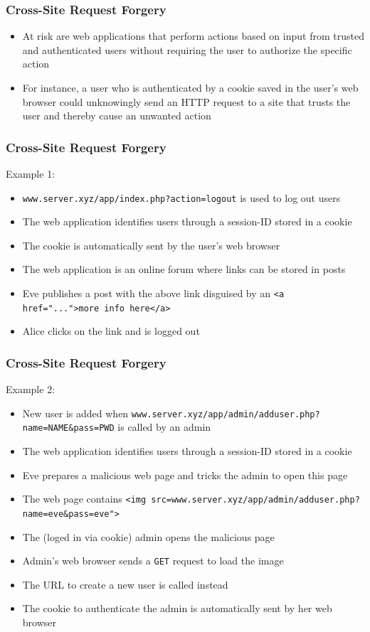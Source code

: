 \begin{frame}
    \frametitle{Cross-Site Request Forgery}
    \begin{itemize}
        \item At risk are web applications that perform actions based on input from trusted and authenticated users without requiring the user to authorize the specific action
        \item For instance, a user who is authenticated by a cookie saved in the user's web browser could unknowingly send an HTTP request to a site that trusts the user and thereby cause an unwanted action
    \end{itemize}
\end{frame}

\begin{frame}[fragile]
    \frametitle{Cross-Site Request Forgery}
    Example 1:
    \begin{itemize}
        \item \verb|www.server.xyz/app/index.php?action=logout| is used to log out users
        \item The web application identifies users through a session-ID stored in a cookie
        \item The cookie is automatically sent by the user's web browser
        \item The web application is an online forum where links can be stored in posts
        \item Eve publishes a post with the above link disguised by an \verb|<a href="...">more info here</a>|
        \item Alice clicks on the link and is logged out
    \end{itemize}
\end{frame}

\begin{frame}[fragile]
    \frametitle{Cross-Site Request Forgery}
    Example 2:
    \begin{itemize}
        \item New user is added when \verb|www.server.xyz/app/admin/adduser.php?name=NAME&pass=PWD| is called by an admin
        \item The web application identifies users through a session-ID stored in a cookie
        \item Eve prepares a malicious web page and tricks the admin to open this page
        \item The web page contains \verb|<img src=www.server.xyz/app/admin/adduser.php?name=eve&pass=eve">|
        \item The (loged in via cookie) admin opens the malicious page
        \item Admin's web browser sends a \verb|GET| request to load the image
        \item The URL to create a new user is called instead
        \item The cookie to authenticate the admin is automatically sent by her web browser
    \end{itemize}
\end{frame}

